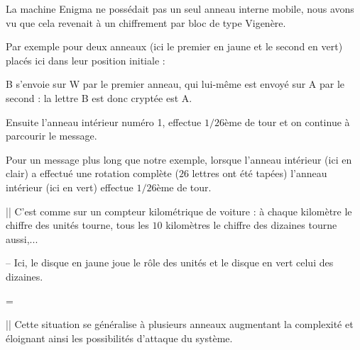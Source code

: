 \diapo

La machine Enigma ne possédait pas un seul anneau interne mobile, nous avons vu que cela revenait à un chiffrement par bloc de type Vigenère. 


Par exemple pour deux anneaux (ici le premier en jaune et le second en vert) 
placés ici dans leur position initiale : 

\change 

B s'envoie sur W par le premier anneau, qui lui-même est envoyé sur A par le second : 
la lettre B est donc cryptée est A.

\change 

Ensuite l'anneau intérieur numéro 1, effectue $1/26$ème de tour et on continue 
à parcourir le message.

Pour un message plus long que notre exemple, lorsque l'anneau intérieur (ici en clair)
a effectué une rotation complète ($26$ lettres ont été tapées) 
l'anneau intérieur (ici en vert) effectue $1/26$ème
de tour.

||  C'est comme sur un compteur kilométrique de voiture :
à chaque kilomètre le chiffre des unités tourne,
tous les $10$ kilomètres le chiffre des dizaines tourne aussi,...

-- Ici, le disque en jaune joue le rôle des unités et le disque en vert celui des dizaines.

=

|| Cette situation se généralise à plusieurs anneaux augmentant 
la complexité et éloignant ainsi les possibilités d'attaque du système.



